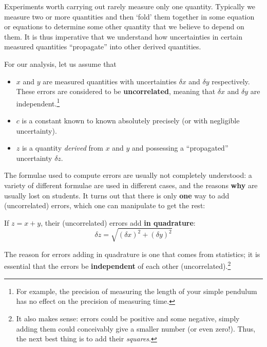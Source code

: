 Experiments worth carrying out rarely measure only one quantity. Typically we measure two or more quantities and then `fold' them together in some equation or equations to determine some other quantity that we believe to depend on them. It is thus imperative that we understand how uncertainties in certain measured quantities ``propagate'' into other derived quantities.

For our analysis, let us assume that

\begin{itemize}
    \item $x$ and $y$ are measured quantities with uncertainties $\delta x$ and $\delta y$ respectively. These errors are considered to be \textbf{uncorrelated}, meaning that $\delta x$ and $\delta y$ are independent.\footnote{For example, the precision of measuring the length of your simple pendulum has no effect on the precision of measuring time.}
    
    \item $c$ is a constant known to known absolutely precisely (or with negligible uncertainty).
    
    \item $z$ is a quantity \textit{derived} from $x$ and $y$ and possessing a ``propagated'' uncertainty $\delta z$.
\end{itemize}

The formulae used to compute errors are usually not completely understood: a variety of different formulae are used in different cases, and the reasons \textbf{why} are usually lost on students. It turns out that there is only \textbf{one} way to add (uncorrelated) errors, which one can manipulate to get the rest:

\begin{imp}
If $z = x + y$, their (uncorrelated) errors add \textbf{in quadrature}:
\begin{equation}
    \delta z = \sqrt{\left(\delta x\right)^2+\left(\delta y\right)^2}
    \label{quadrature}
\end{equation}
\end{imp}

The reason for errors adding in quadrature is one that comes from statistics; it is essential that the errors be \textbf{independent} of each other (uncorrelated).\footnote{It also makes sense:  errors could be positive and some negative, simply adding them could conceivably give a smaller number (or even zero!). Thus, the next best thing is to add their \textit{squares}.}

